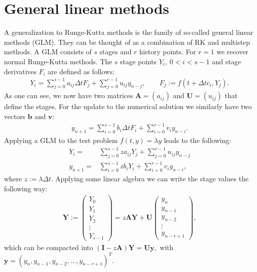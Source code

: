 \documentclass[10pt,a4paper]{article}
\newcommand{\bvec}[1]{\mathbf{#1}}
\begin{document}
\section{General linear methods}
A generalization to Runge-Kutta methods is the family of so-called general linear methods (GLM).
They can be thought of as a combination of RK and multistep methods.
A GLM consists of $s$ stages and $r$ history points. For $r=1$ we recover normal Runge-Kutta methods.
The $s$ stage points $Y_i,~0<i<s-1$ and stage derivatives $F_i$ are defined as follows:
\begin{align*}
  Y_i = \sum_{j=0}^{s-1} a_{ij}\Delta t F_j + \sum_{j=0}^{r-1}u_{ij} y_{n-j}, \qquad F_j := f(t+\Delta t c_i, Y_j).
\end{align*}
As one can see, we now have two matrices $\bvec{A} = (a_{ij})$ and $\bvec{U} = (u_{ij})$ that define the stages.
For the update to the numerical solution we similarly have two vectors $\bvec{b}$ and $\bvec{v}$:
\begin{align*}
  y_{n+1} = \sum_{i=0}^{s-1} b_i\Delta t F_i + \sum_{i=0}^{r-1}v_i y_{n-i}.
\end{align*}
Applying a GLM to the test problem $f(t,y) = \lambda y$ leads to the following:
\begin{align*}
  Y_i =& \sum_{j=0}^{s-1} z a_{ij} Y_j + \sum_{j=0}^{r-1} u_{ij}y_{n-j} \\
  y_{n+1} =& \sum_{i=0}^{s-1} z b_i Y_i + \sum_{i=0}^{r-1} v_iy_{n-i},
\end{align*}
where $z:=\lambda \Delta t.$
Applying some linear algebra we can write the stage values the following way:
\begin{align*}
  \bvec{Y} := \begin{pmatrix}
    Y_0 \\
    Y_1 \\
    Y_2 \\
    \vdots \\
    Y_{s-1} 
  \end{pmatrix} = z \bvec{A} \bvec{Y} + \bvec{U}\begin{pmatrix}
    y_n \\
    y_{n-1} \\
    y_{n-2} \\
    \vdots \\
    y_{n-r+1}
  \end{pmatrix},
\end{align*}
which can be compacted into $(\bvec{I} - z \bvec{A})\bvec{Y} = \bvec{U} \bvec{y},$ with $\bvec{y} = (y_n, y_{n-1}, y_{n-2}, \hdots, y_{n-r+1})^T.$
\end{document}
